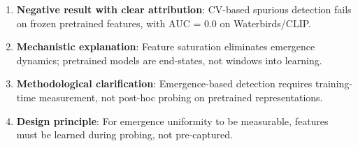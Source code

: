 \begin{enumerate}
    \item \textbf{Negative result with clear attribution}: CV-based spurious detection fails on frozen pretrained features, with AUC = 0.0 on Waterbirds/CLIP.
    \item \textbf{Mechanistic explanation}: Feature saturation eliminates emergence dynamics; pretrained models are end-states, not windows into learning.
    \item \textbf{Methodological clarification}: Emergence-based detection requires training-time measurement, not post-hoc probing on pretrained representations.
    \item \textbf{Design principle}: For emergence uniformity to be measurable, features must be learned during probing, not pre-captured.
\end{enumerate}
